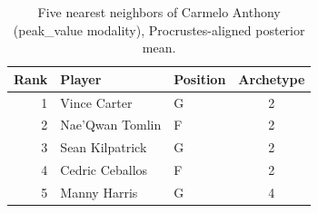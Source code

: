 \begin{table}[htbp]
  \centering\small
  \begin{tabular}{rllc}
    \toprule
    Rank & Player & Position & Archetype \\
    \midrule
    1 & Vince Carter & G & 2 \\
    2 & Nae'Qwan Tomlin & F & 2 \\
    3 & Sean Kilpatrick & G & 2 \\
    4 & Cedric Ceballos & F & 2 \\
    5 & Manny Harris & G & 4 \\
    \bottomrule
  \end{tabular}
  \caption{Five nearest neighbors of Carmelo Anthony (peak_value modality), Procrustes-aligned posterior mean.}
  \label{tab:Carmelo_Anthony_neighbors_peak_value}
\end{table}

